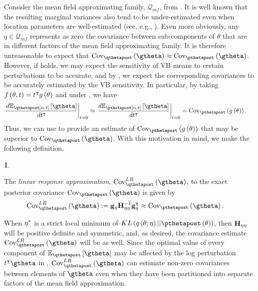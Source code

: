 \documentclass{article}\usepackage[]{graphicx}\usepackage[]{color}
\theoremstyle{plain}
\theoremstyle{definition}
\newtheorem{defn}[thm]{\protect\definitionname}
\theoremstyle{plain}
\theoremstyle{plain}
\theoremstyle{plain}
\theoremstyle{plain}
\providecommand{\definitionname}{Definition}
\begin{document}
Consider the mean field approximating family, $\mathcal{Q}_{mf}$,
from . It is well known that
the resulting marginal variances also tend to be under-estimated even
when location parameters are well-estimated (see, e.g., \citep[Chapter 10]{mackay:2003:information,wang:2005:inadequacy,turner:2011:two,bishop:2006:pattern}).
Even more obviously, any $q\in\mathcal{Q}_{mf}$ represents as zero
the covariance between sub-components of $\theta$ that are in different
factors of the mean field approximating family. It is therefore unreasonable
to expect that $\cov_{\qthetapost}\left(\gtheta\right)\approx\cov_{\pthetapost}\left(\gtheta\right)$.
However, if  holds, we may expect the
sensitivity of VB means to certain perturbations to be accurate, and
by , we expect the corresponding covariances
to be accurately estimated by the VB sensitivity. In particular, by
taking $f\left(\theta,t\right)=t^{\intercal}g\left(\theta\right)$ and
under , we have
\begin{align*}
\left.\frac{d\mbe_{\qtthetapost}\left[\gtheta\right]}{dt^{\trans}}\right|_{t=0} & \approx\left.\frac{d\mbe_{\ptthetapost}\left[\gtheta\right]}{dt^{\trans}}\right|_{t=0}=\cov_{\pthetapost}\left(g\left(\theta\right)\right).
\end{align*}
 Thus, we can use  to provide an estimate
of $\cov_{\pthetapost}\left(g\left(\theta\right)\right)$ that may
be superior to $\cov_{\qthetapost}\left(\gtheta\right)$. With this
motivation in mind, we make the following definition.
\begin{defn}
\label{def:lrvb_covariance}

The \textit{linear response approximation}, $\lrvbcov\left(\gtheta\right)$,
to the exact posterior covariance $\cov_{\pthetapost}\left(\gtheta\right)$
is given by
\begin{align}
\lrvbcov\left(\gtheta\right) & :=\eggrad\klhess^{-1}\eggrad^{\trans}\approx\cov_{\pthetapost}\left(\gtheta\right).\label{eq:lrvb_for_covariance}
\end{align}
%
\end{defn}

When $\eta^{*}$ is a strict local minimum of $KL\left(q\left(\theta;\eta\right)||\pthetapost\left(\theta\right)\right)$,
then $\mathbf{H}_{\eta\eta}$ will be positive definite and symmetric, and, as desired,
the covariance estimate $\lrvbcov\left(\gtheta\right)$ will be as
well. Since the optimal value of every component of $\mbe_{\qthetapost}\left[\gtheta\right]$
may be affected by the log perturbation $t^{\trans}\gtheta$ in ,
$\lrvbcov\left(\gtheta\right)$ can estimate non-zero covariances
between elements of $\gtheta$ even when they have been partitioned
into separate factors of the mean field approximation. 
\end{document}
